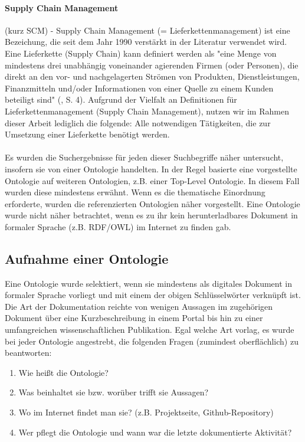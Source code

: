 \documentclass{article}
\begin{document}
\paragraph{Supply Chain Management} (kurz SCM) - Supply Chain Management (= Lieferkettenmanagement) ist eine Bezeichung, die seit dem Jahr 1990 verstärkt in der Literatur verwendet wird. Eine Lieferkette (Supply Chain) kann definiert werden als "eine Menge von mindestens drei unabhängig voneinander agierenden Firmen (oder Personen), die direkt an den vor- und nachgelagerten Strömen von Produkten, Dienstleistungen, Finanzmitteln und/oder Informationen von einer Quelle zu einem Kunden beteiligt sind" (\cite{mentzer2001defining}, S. 4). Aufgrund der Vielfalt an Definitionen für Lieferkettenmanagement (Supply Chain Management), nutzen wir im Rahmen dieser Arbeit lediglich die folgende: Alle notwendigen Tätigkeiten, die zur Umsetzung einer Lieferkette benötigt werden.

\paragraph{} Es wurden die Suchergebnisse für jeden dieser Suchbegriffe näher untersucht, insofern sie von einer Ontologie handelten.
In der Regel basierte eine vorgestellte Ontologie auf weiteren Ontologien, z.B. einer Top-Level Ontologie.
In diesem Fall wurden diese mindestens erwähnt.
Wenn es die thematische Einordnung erforderte, wurden die referenzierten Ontologien näher vorgestellt.
Eine Ontologie wurde nicht näher betrachtet, wenn es zu ihr kein herunterladbares Dokument in formaler Sprache (z.B. RDF/OWL) im Internet zu finden gab.


\subsection{Aufnahme einer Ontologie}

Eine Ontologie wurde selektiert, wenn sie mindestens als digitales Dokument in formaler Sprache vorliegt und mit einem der obigen Schlüsselwörter verknüpft ist.
Die Art der Dokumentation reichte von wenigen Aussagen im zugehörigen Dokument über eine Kurzbeschreibung in einem Portal bis hin zu einer umfangreichen wissenschaftlichen Publikation.
Egal welche Art vorlag, es wurde bei jeder Ontologie angestrebt, die folgenden Fragen (zumindest oberflächlich) zu beantworten:

\begin{enumerate}
    \item Wie heißt die Ontologie?
    \item Was beinhaltet sie bzw. worüber trifft sie Aussagen?
    \item Wo im Internet findet man sie? (z.B. Projektseite, Github-Repository)
    \item Wer pflegt die Ontologie und wann war die letzte dokumentierte Aktivität?
\end{enumerate}
\end{document}
